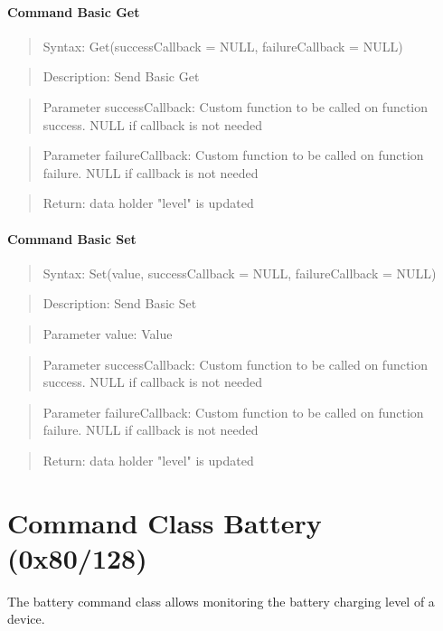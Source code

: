 \paragraph {Command Basic Get}
\begin{quote} Syntax: Get(successCallback = NULL, failureCallback = NULL)\end{quote}
\begin{quote} Description: Send Basic Get\end{quote}
\begin{quote} Parameter successCallback: Custom function to be called on function success. NULL if callback is not needed\end{quote}
\begin{quote} Parameter failureCallback: Custom function to be called on function failure. NULL if callback is not needed\end{quote}
\begin{quote} Return: data holder "level" is updated \end{quote}

\paragraph {Command Basic Set}
\begin{quote} Syntax: Set(value, successCallback = NULL, failureCallback = NULL)\end{quote}
\begin{quote} Description: Send Basic Set\end{quote}
\begin{quote} Parameter value: Value\end{quote}
\begin{quote} Parameter successCallback: Custom function to be called on function success. NULL if callback is not needed\end{quote}
\begin{quote} Parameter failureCallback: Custom function to be called on function failure. NULL if callback is not needed\end{quote}
\begin{quote} Return: data holder "level" is updated \end{quote}
 
 
\section{Command Class Battery (0x80/128)}

The battery command class allows monitoring the battery charging level of a device.

